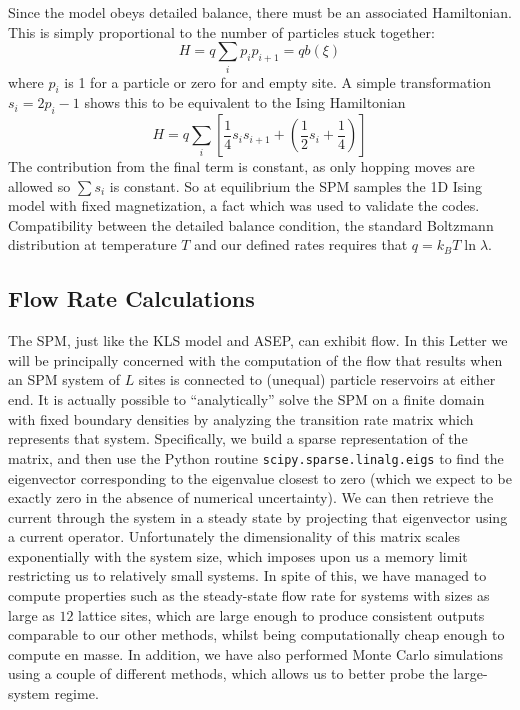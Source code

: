 \documentclass[
reprint, amsmath,amssymb,
]{revtex4-1}
\begin{document}
Since the model obeys detailed balance, there must be an associated
Hamiltonian.  This is simply proportional to the number of particles stuck together:
\begin{equation}
 H = q \sum_i p_ip_{i+1} = q b(\xi)
\end{equation}
where $p_i$ is 1 for a particle or zero for and empty site.  A simple
transformation $s_i = 2p_i-1$ shows this to be equivalent to the Ising
Hamiltonian
\begin{equation}
 H = q \sum_i \left[ \frac{1}{4} s_i s_{i+1} + \left( \frac{1}{2} s_i + \frac{1}{4} \right) \right]
\end{equation}
The contribution from the final term is constant, as only hopping moves are allowed so 
$\sum s_i$ is constant. So at equilibrium the SPM samples the 1D
Ising model with fixed magnetization, a fact which was used to
validate the codes. Compatibility between the detailed balance condition, the standard Boltzmann distribution at temperature $T$ and our defined rates requires that $q = k_B T\ln{\lambda} $.

\subsection{Flow Rate Calculations}

The SPM, just like the KLS model and ASEP, can exhibit flow. In this Letter we will be principally concerned with the computation of the flow that results when an SPM system of $L$ sites
is connected to (unequal) particle reservoirs at either end.
It is actually possible
to ``analytically'' solve the SPM on a finite domain with fixed boundary densities by analyzing the transition rate matrix which represents that system.
Specifically, we build a sparse representation of the matrix, and then use the Python routine \texttt{scipy.sparse.linalg.eigs} to find the eigenvector corresponding to the eigenvalue closest to zero
(which we expect to be exactly zero in the absence of numerical uncertainty). We can then retrieve the current through the system in a steady state by projecting that eigenvector using a current operator.
Unfortunately the dimensionality of this matrix scales exponentially with the system size, which imposes upon us a memory limit restricting us to
relatively small systems. In spite of this, we have managed to compute properties such as the steady-state flow rate for systems with sizes as large as $12$ lattice sites,
which are large enough to produce consistent outputs comparable to our other methods, whilst being computationally cheap enough to compute en masse.
In addition, we have also performed Monte Carlo simulations using a couple of different methods, which allows us to better probe the large-system regime.
\end{document}
